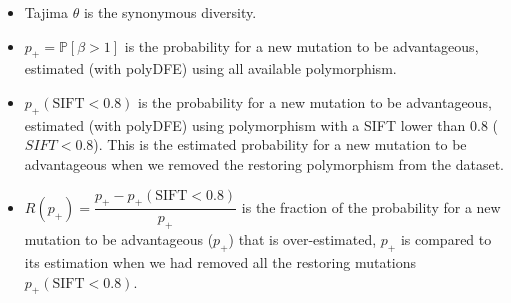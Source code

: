\documentclass{article}
\newcommand{\proba}{\mathbb{P}}
\newcommand{\Spop}{\beta}
\newcommand{\polyAdv}{ \Spop > 1}
\newcommand{\PpolyAdv}{\proba \left[ \polyAdv \right]}
\begin{document}
    \begin{itemize}
        \item Tajima $\theta$ is the synonymous diversity.
        \item $p_+=\PpolyAdv$ is the probability for a new mutation to be advantageous, estimated (with polyDFE) using all available polymorphism.
        \item $p_+ (\textrm{SIFT} < 0.8)$ is the probability for a new mutation to be advantageous, estimated (with polyDFE) using polymorphism with a SIFT lower than 0.8 ($SIFT < 0.8$).
        This is the estimated probability for a new mutation to be advantageous when we removed the restoring polymorphism from the dataset.
        \item $R(p_+)=\dfrac{p_+ - p_+ (\textrm{SIFT} < 0.8)}{p_+}$ is the fraction of the probability for a new mutation to be advantageous ($p_+$) that is over-estimated, $p_+$ is compared to its estimation when we had removed all the restoring mutations $p_+ (\textrm{SIFT} < 0.8)$.
    \end{itemize}
    \newpage
    
\end{document}
